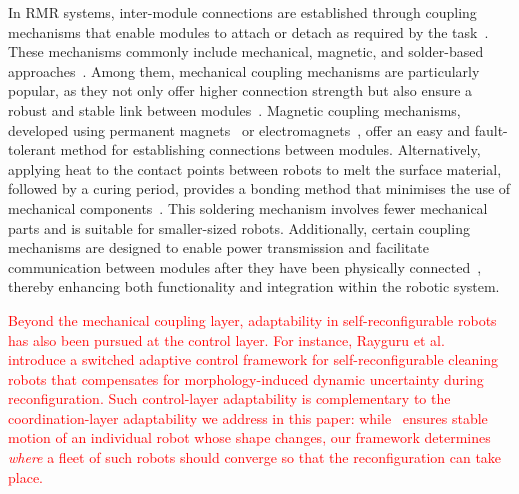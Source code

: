 \documentclass[journal]{IEEEtran}
\begin{document}
In RMR systems, inter-module connections are established through coupling mechanisms that enable modules to attach or detach as required by the task~\cite{saab2019review}. These mechanisms commonly include mechanical, magnetic, and solder-based approaches~\cite{paik2019}. Among them, mechanical coupling mechanisms are particularly popular, as they not only offer higher connection strength but also ensure a robust and stable link between modules~\cite{rus2001crystalline,Mori}. Magnetic coupling mechanisms, developed using permanent magnets~\cite{3D_M-blocks,modquad} or electromagnets~\cite{kubits2020,Tiled_ardesign}, offer an easy and fault-tolerant method for establishing connections between modules. Alternatively, applying heat to the contact points between robots to melt the surface material, followed by a curing period, provides a bonding method that minimises the use of mechanical components~\cite{swissler2018fireant,swissler2020fireant3d}. This soldering mechanism involves fewer mechanical parts and is suitable for smaller-sized robots. Additionally, certain coupling mechanisms are designed to enable power transmission and facilitate communication between modules after they have been physically connected~\cite{HerCel}, thereby enhancing both functionality and integration within the robotic system.

\textcolor{red}{Beyond the mechanical coupling layer, adaptability in self-reconfigurable robots has also been pursued at the control layer. For instance, Rayguru et al.~\cite{rayguru2024switched} introduce a switched adaptive control framework for self-reconfigurable cleaning robots that compensates for morphology-induced dynamic uncertainty during reconfiguration. Such control-layer adaptability is complementary to the coordination-layer adaptability we address in this paper: while~\cite{rayguru2024switched} ensures stable motion of an individual robot whose shape changes, our framework determines \emph{where} a fleet of such robots should converge so that the reconfiguration can take place.}
\end{document}
